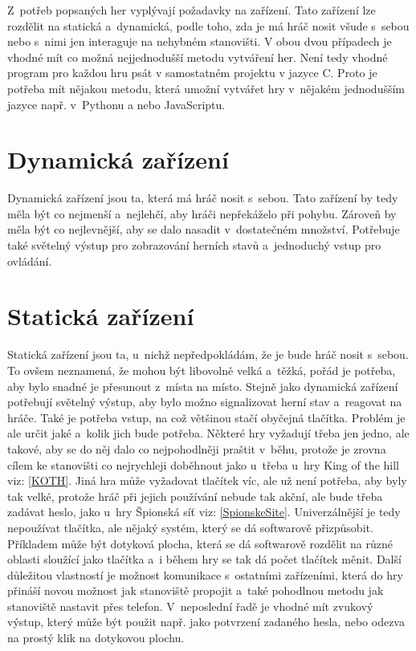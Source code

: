 Z~potřeb popsaných her vyplývají požadavky na zařízení.
Tato zařízení lze rozdělit na statická a~dynamická, podle toho, zda je má hráč nosit všude s~sebou nebo s~nimi jen interaguje na nehybném stanovišti.
V obou dvou případech je vhodné mít co možná nejjednodušší metodu vytváření her.
Není tedy vhodné program pro každou hru psát v samostatném projektu v jazyce C.
Proto je potřeba mít nějakou metodu, která umožní vytvářet hry v~nějakém jednodušším jazyce např. v~Pythonu a nebo JavaScriptu.

\section{Dynamická zařízení}
Dynamická zařízení jsou ta, která má hráč nosit s~sebou.
Tato zařízení by tedy měla být co nejmenší a~nejlehčí, aby hráči nepřekáželo při pohybu.
Zároveň by měla být co nejlevnější, aby se dalo nasadit v~dostatečném množství.
Potřebuje také světelný výstup pro zobrazování herních stavů a~jednoduchý vstup pro ovládání. 

\section{Statická zařízení}
Statická zařízení jsou ta, u~nichž nepředpokládám, že je bude hráč nosit s~sebou.
To ovšem neznamená, že mohou být libovolně velká a~těžká, pořád je potřeba, aby bylo snadné je přesunout z~místa na místo.
Stejně jako dynamická zařízení potřebují světelný výstup, aby bylo možno signalizovat herní stav a~reagovat na hráče.
Také je potřeba vstup, na což většinou stačí obyčejná tlačítka.
Problém je ale určit jaké a~kolik jich bude potřeba.
Některé hry vyžadují třeba jen jedno, ale takové, aby se do něj dalo co nejpohodlněji praštit v~běhu, protože je zrovna cílem ke stanovišti co nejrychleji doběhnout jako u~třeba u~hry King of the hill {viz: \ref{KOTH}}.
Jiná hra může vyžadovat tlačítek víc, ale už není potřeba, aby byly tak velké, protože hráč při jejich používání nebude tak akční, ale bude třeba zadávat heslo, jako u~hry Špionská síť {viz: \ref{SpionskeSite}}.
Univerzálnější je tedy nepoužívat tlačítka, ale nějaký systém, který se dá softwarově přizpůsobit.
Příkladem může být dotyková plocha, která se dá softwarově rozdělit na různé oblasti sloužící jako tlačítka a~i během hry se tak dá počet tlačítek měnit.
Další důležitou vlastností je možnost komunikace s~ostatními zařízeními, která do hry přináší novou možnost jak stanoviště propojit a~také pohodlnou metodu jak stanoviště nastavit přes telefon.
V~neposlední řadě je vhodné mít zvukový výstup, který může být použit např. jako potvrzení zadaného hesla, nebo odezva na prostý klik na dotykovou plochu.

